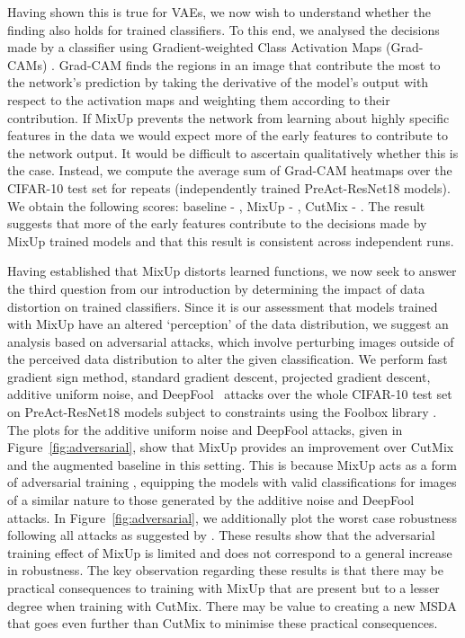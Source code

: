 \documentclass[journal]{IEEEtran}
\newcommand{\mixup}{MixUp\xspace}
\newcommand{\cutmix}{CutMix\xspace}
\begin{document}
Having shown this is true for VAEs, we now wish to understand whether the finding also holds for trained classifiers. To this end, we analysed the decisions made by a classifier using Gradient-weighted Class Activation Maps (Grad-CAMs) \citep{selvaraju2017grad}. Grad-CAM finds the regions in an image that contribute the most to the network's prediction by taking the derivative of the model's output with respect to the activation maps and weighting them according to their contribution. If \mixup prevents the network from learning about highly specific features in the data we would expect more of the early features to contribute to the network output. It would be difficult to ascertain qualitatively whether this is the case. Instead, we compute the average sum of Grad-CAM heatmaps over the CIFAR-10 test set for  repeats (independently trained PreAct-ResNet18 models). We obtain the following scores: baseline - , \mixup{} - , \cutmix{} - . The result suggests that more of the early features contribute to the decisions made by \mixup trained models and that this result is consistent across independent runs.

Having established that \mixup distorts learned functions, we now seek to answer the third question from our introduction by determining the impact of data distortion on trained classifiers.
Since it is our assessment that models trained with \mixup have an altered `perception' of the data distribution, we suggest an analysis based on adversarial attacks, which involve perturbing images outside of the perceived data distribution to alter the given classification.
We perform fast gradient sign method, standard gradient descent, projected gradient descent, additive uniform noise, and DeepFool~\citep{moosavi2016deepfool} attacks over the whole CIFAR-10 test set on PreAct-ResNet18 models subject to  constraints using the Foolbox library \citep{rauber2020foolboxnative,rauber2017foolbox}. The plots for the additive uniform noise and DeepFool attacks, given in Figure~\ref{fig:adversarial}, show that \mixup provides an improvement over \cutmix and the augmented baseline in this setting. 
This is because \mixup acts as a form of adversarial training \citep{goodfellow2014explaining}, equipping the models with valid classifications for images of a similar nature to those generated by the additive noise and DeepFool attacks.
In Figure~\ref{fig:adversarial}, we additionally plot the worst case robustness following all attacks as suggested by \citet{carlini2019evaluating}. These results show that the adversarial training effect of \mixup is limited and does not correspond to a general increase in robustness.
The key observation regarding these results is that there may be practical consequences to training with \mixup that are present but to a lesser degree when training with \cutmix. There may be value to creating a new MSDA that goes even further than \cutmix to minimise these practical consequences.
\end{document}
